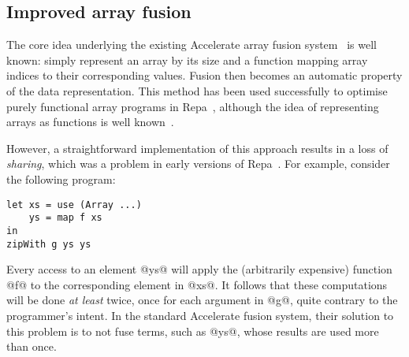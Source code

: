 \subsection{Improved array fusion}

The core idea underlying the existing Accelerate array fusion
system~\cite{McDonell:acc-optim} is well known: simply represent an array by its
size and a function mapping array indices to their corresponding values. Fusion
then becomes an automatic property of the data representation. This method has
been used successfully to optimise purely functional array programs in
Repa~\cite{Keller:Repa,Lippmeier:Guiding}, although the idea of representing
arrays as functions is well
known~\cite{Claessen:obsidian-expressive,Guibas:1978jh,Elliott:2003ug}.



However, a straightforward implementation of this approach results in a loss of
\emph{sharing}, which was a problem in early versions of
Repa~\cite{Lippmeier:Guiding}. For example, consider the following program:
%
\begin{lstlisting}
let xs = use (Array ...)
    ys = map f xs
in
zipWith g ys ys
\end{lstlisting}
%
Every access to an element @ys@ will apply the (arbitrarily expensive) function @f@
to the corresponding element in @xs@. It follows that these computations will be
done \emph{at least} twice, once for each argument in @g@, quite contrary to the
programmer's intent. In the standard Accelerate fusion system, their solution to
this problem is to not fuse terms, such as @ys@, whose results are used more than
once.


